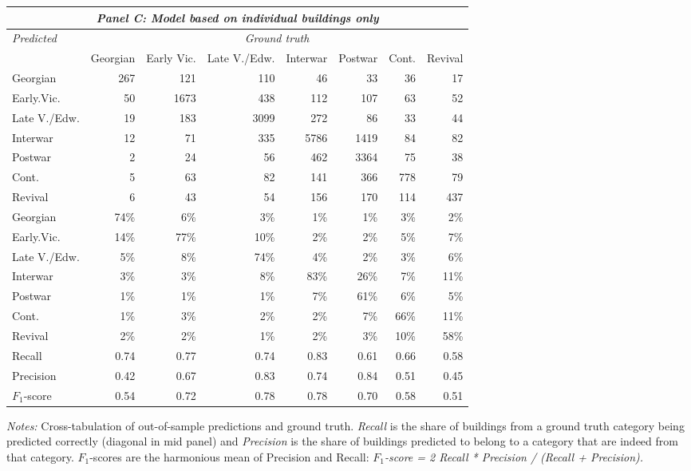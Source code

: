 \begin{table}[!htb]
\begin{tabular}{lrrrrrrr}
  \bottomrule
	\multicolumn{8}{c}{\rule{0pt}{4ex}    \emph{Panel C: Model based on individual buildings only} \rule{0pt}{4ex}    }\\
	\toprule
	\emph{Predicted} & \multicolumn{7}{c}{\emph{Ground truth}} \\
	\cmidrule(lr){1-1}
	\cmidrule(lr){2-8}
	& Georgian & Early Vic. & Late V./Edw. & Interwar & Postwar & Cont. & Revival \\
  \midrule
	Georgian & 267 & 121 & 110 & 46 & 33 & 36 & 17 \\
	  Early.Vic. & 50 & 1673 & 438 & 112 & 107 & 63 & 52 \\
	  Late V./Edw. & 19 & 183 & 3099 & 272 & 86 & 33 & 44 \\
	  Interwar & 12 & 71 & 335 & 5786 & 1419 & 84 & 82 \\
	  Postwar & 2 & 24 & 56 & 462 & 3364 & 75 & 38 \\
	  Cont. & 5 & 63 & 82 & 141 & 366 & 778 & 79 \\
	  Revival & 6 & 43 & 54 & 156 & 170 & 114 & 437 \\
	\midrule
	  Georgian & 74\% & 6\% & 3\% & 1\% & 1\% & 3\% & 2\% \\
	  Early.Vic. & 14\% & 77\% & 10\% & 2\% & 2\% & 5\% & 7\% \\
	  Late V./Edw. & 5\% & 8\% & 74\% & 4\% & 2\% & 3\% & 6\% \\
	  Interwar & 3\% & 3\% & 8\% & 83\% & 26\% & 7\% & 11\% \\
	  Postwar & 1\% & 1\% & 1\% & 7\% & 61\% & 6\% & 5\% \\
	  Cont. & 1\% & 3\% & 2\% & 2\% & 7\% & 66\% & 11\% \\
	  Revival & 2\% & 2\% & 1\% & 2\% & 3\% & 10\% & 58\% \\
		\midrule
	  Recall & 0.74 & 0.77 & 0.74 & 0.83 & 0.61 & 0.66 & 0.58 \\
	  Precision & 0.42 & 0.67 & 0.83 & 0.74 & 0.84 & 0.51 & 0.45 \\
	  $F_1$-score & 0.54 & 0.72 & 0.78 & 0.78 & 0.70 & 0.58 & 0.51 \\
	 \bottomrule
\end{tabular}

\begin{minipage}{\textwidth}
\footnotesize
	\emph{Notes:} Cross-tabulation of out-of-sample predictions and ground truth.
	\emph{Recall} is the share of buildings from a ground truth category being predicted correctly (diagonal in mid panel) and \emph{Precision} is the share of buildings predicted to belong to a category that are indeed from that category.
	$F_1$-scores are the harmonious mean of Precision and Recall: \emph{ $F_1$-score = 2 Recall * Precision / (Recall + Precision).}
\end{minipage}


\endgroup
\end{table}
